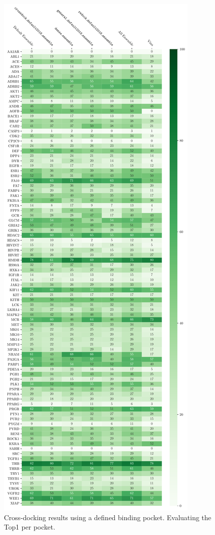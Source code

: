 \documentclass[journal=jcisd8,manuscript=article]{achemso}
\begin{document}
\begin{figure}
    \centering
    \includegraphics{figures/crossdocking/top1_per_pocket.pdf}
    \caption{Cross-docking results using a defined binding pocket. Evaluating the Top1 per pocket.}
    \label{fig:Top1_PerPock}
\end{figure}
\end{document}
